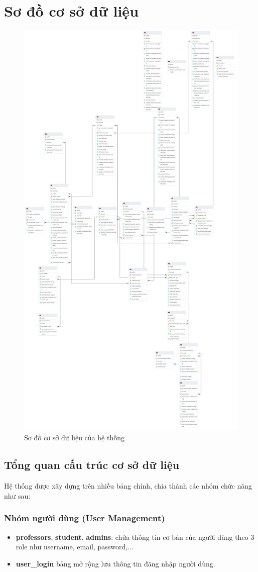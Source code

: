 \section{Sơ đồ cơ sở dữ liệu}
\begin{figure}[H]
    \centering
    \includegraphics[width=0.6\linewidth]{images/ERD.png}
    \caption{Sơ đồ cơ sở dữ liệu của hệ thống}
    \label{fig:enter-label}
\end{figure}

\subsection{Tổng quan cấu trúc cơ sở dữ liệu}
Hệ thống được xây dựng trên nhiều bảng chính, chia thành các nhóm chức năng như sau:

\subsubsection{Nhóm người dùng (User Management)}
\begin{itemize}
    \item \textbf{professors}, \textbf{student}, \textbf{admins}: chứa thông tin cơ bản của người dùng theo 3 role như username, email, password,...
    \item \textbf{user\_login}\: bảng mở rộng lưu thông tin đăng nhập người dùng.
\end{itemize}

